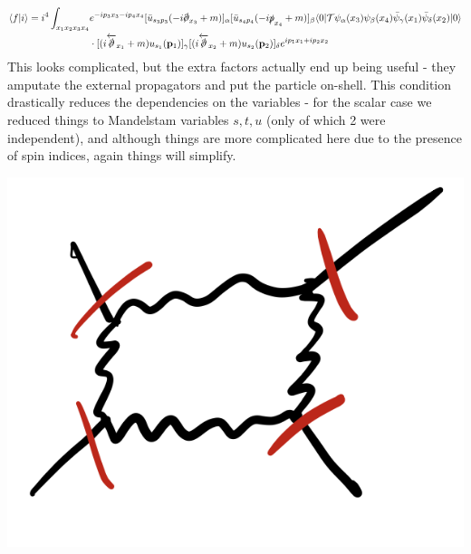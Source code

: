 \begin{equation}
    \begin{split}
        \braket{f}{i} = i^4\int_{x_1x_2x_3x_4}&e^{-ip_3x_3 - ip_4x_4}[\bar{u}_{s_3p_3}(-i\slashed{\p}_{x_3} + m)]_{\alpha}[\bar{u}_{s_4p_4}(-i\slashed{p}_{x_4} + m)]_{\beta}\bra{0}\mathcal{T}\psi_{\alpha}(x_3)\psi_{\beta}(x_4)\bar{\psi}_{\gamma}(x_1)\bar{\psi}_{\delta}(x_2)\ket{0}
        \\ &\cdot [(i\overleftarrow{\slashed{\p}}_{x_1} + m)u_{s_1}(\v{p}_1)]_\gamma[(i\overleftarrow{\slashed{\p}}_{x_2} + m)u_{s_2}(\v{p}_2)]_\delta e^{ip_1x_1 + ip_2x_2}
    \end{split}
\end{equation}
This looks complicated, but the extra factors actually end up being useful - they amputate the external propagators and put the particle on-shell. This condition drastically reduces the dependencies on the variables - for the scalar case we reduced things to Mandelstam variables $s, t, u$ (only of which 2 were independent), and although things are more complicated here due to the presence of spin indices, again things will simplify.

\begin{center}
    \includegraphics[scale=0.35]{Lectures/Images/lec12-amputatedlegs.png}
\end{center}

